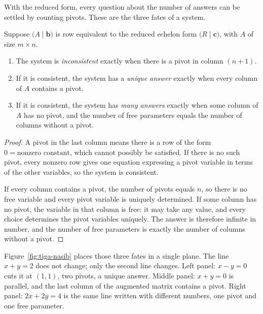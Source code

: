 With the reduced form, every question about the number of answers can be settled by counting
pivots. These are the three fates of a system.

\begin{teorema}
Suppose $\bigl(A\mid\mathbf{b}\bigr)$ is row equivalent to the reduced echelon form
$\bigl(R\mid\mathbf{c}\bigr)$, with $A$ of size $m\times n$.
\begin{enumerate}
  \item The system is \emph{inconsistent} exactly when there is a pivot in column $(n+1)$.
  \item If it is consistent, the system has a \emph{unique answer} exactly when every column
        of $A$ contains a pivot.
  \item If it is consistent, the system has \emph{many answers} exactly when some column of $A$
        has no pivot, and the number of free parameters equals the number of columns without a
        pivot.
\end{enumerate}
\end{teorema}

\begin{proof}
A pivot in the last column means there is a row of the form $0=\text{nonzero constant}$, which
cannot possibly be satisfied. If there is no such pivot, every nonzero row gives one equation
expressing a pivot variable in terms of the other variables, so the system is consistent.

If every column contains a pivot, the number of pivots equals $n$, so there is no free variable
and every pivot variable is uniquely determined. If some column has no pivot, the variable in
that column is free: it may take any value, and every choice determines the pivot variables
uniquely. The answer is therefore infinite in number, and the number of free parameters is
exactly the number of columns without a pivot.
\end{proof}

Figure~\ref{fig:tiga-nasib} places those three fates in a single plane. The line $x+y=2$ does
not change; only the second line changes. Left panel: $x-y=0$ cuts it at $(1,1)$, two pivots,
a unique answer. Middle panel: $x+y=0$ is parallel, and the last column of the augmented matrix
contains a pivot. Right panel: $2x+2y=4$ is the same line written with different numbers, one
pivot and one free parameter.


